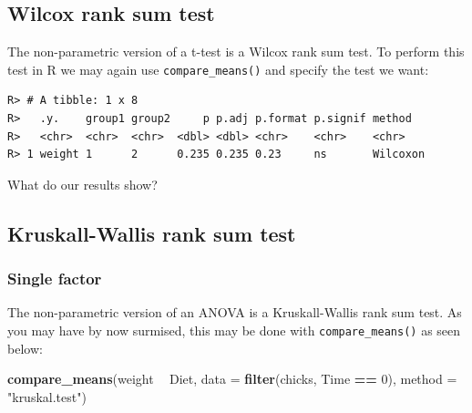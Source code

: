 \documentclass[english,10pt,a4paper,oneside]{book}
\newenvironment{Shaded}{\begin{snugshade}}{\end{snugshade}}
\newcommand{\KeywordTok}[1]{\textcolor[rgb]{0.13,0.29,0.53}{\textbf{#1}}}
\newcommand{\DataTypeTok}[1]{\textcolor[rgb]{0.13,0.29,0.53}{#1}}
\newcommand{\DecValTok}[1]{\textcolor[rgb]{0.00,0.00,0.81}{#1}}
\newcommand{\StringTok}[1]{\textcolor[rgb]{0.31,0.60,0.02}{#1}}
\newcommand{\OperatorTok}[1]{\textcolor[rgb]{0.81,0.36,0.00}{\textbf{#1}}}
\newcommand{\NormalTok}[1]{#1}
\theoremstyle{definition}
\theoremstyle{definition}
\theoremstyle{definition}
\theoremstyle{remark}
\begin{document}
\subsection{Wilcox rank sum test}\label{wilcox-rank-sum-test}

The non-parametric version of a t-test is a Wilcox rank sum test. To
perform this test in R we may again use \texttt{compare\_means()} and
specify the test we want:

\begin{Shaded}
\end{Shaded}

\begin{verbatim}
R> # A tibble: 1 x 8
R>   .y.    group1 group2     p p.adj p.format p.signif method  
R>   <chr>  <chr>  <chr>  <dbl> <dbl> <chr>    <chr>    <chr>   
R> 1 weight 1      2      0.235 0.235 0.23     ns       Wilcoxon
\end{verbatim}

What do our results show?

\subsection{Kruskall-Wallis rank sum
test}\label{kruskall-wallis-rank-sum-test}

\subsubsection{Single factor}\label{single-factor-1}

The non-parametric version of an ANOVA is a Kruskall-Wallis rank sum
test. As you may have by now surmised, this may be done with
\texttt{compare\_means()} as seen below:

\begin{Shaded}
\begin{Highlighting}[]
\KeywordTok{compare_means}\NormalTok{(weight }\OperatorTok{~}\StringTok{ }\NormalTok{Diet, }\DataTypeTok{data =} \KeywordTok{filter}\NormalTok{(chicks, Time }\OperatorTok{==}\StringTok{ }\DecValTok{0}\NormalTok{), }\DataTypeTok{method =} \StringTok{"kruskal.test"}\NormalTok{)}
\end{Highlighting}
\end{Shaded}
\end{document}
